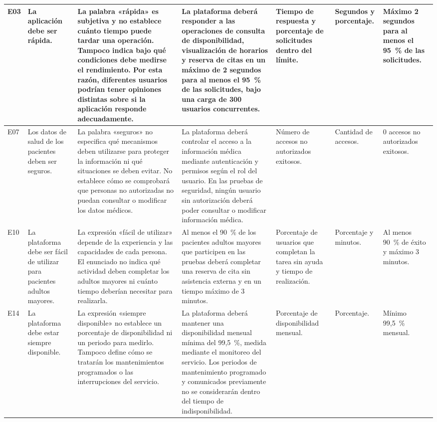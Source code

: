 \begin{landscape}
\begin{longtable}{|L{0.05\tw}|L{0.135\tw}|L{0.195\tw}|L{0.26\tw}|L{0.13\tw}|L{0.09\tw}|L{0.14\tw}|}
E03 & La aplicación debe ser rápida. & La palabra «rápida» es subjetiva y no establece cuánto tiempo puede tardar una operación. Tampoco indica bajo qué condiciones debe medirse el rendimiento. Por esta razón, diferentes usuarios podrían tener opiniones distintas sobre si la aplicación responde adecuadamente. & La plataforma deberá responder a las operaciones de consulta de disponibilidad, visualización de horarios y reserva de citas en un máximo de 2 segundos para al menos el 95~\% de las solicitudes, bajo una carga de 300 usuarios concurrentes. & Tiempo de respuesta y porcentaje de solicitudes dentro del límite. & Segundos y porcentaje. & Máximo 2 segundos para al menos el 95~\% de las solicitudes. \\ \hline
E07 & Los datos de salud de los pacientes deben ser seguros. & La palabra «seguros» no especifica qué mecanismos deben utilizarse para proteger la información ni qué situaciones se deben evitar. No establece cómo se comprobará que personas no autorizadas no puedan consultar o modificar los datos médicos. & La plataforma deberá controlar el acceso a la información médica mediante autenticación y permisos según el rol del usuario. En las pruebas de seguridad, ningún usuario sin autorización deberá poder consultar o modificar información médica. & Número de accesos no autorizados exitosos. & Cantidad de accesos. & 0 accesos no autorizados exitosos. \\ \hline
E10 & La plataforma debe ser fácil de utilizar para pacientes adultos mayores. & La expresión «fácil de utilizar» depende de la experiencia y las capacidades de cada persona. El enunciado no indica qué actividad deben completar los adultos mayores ni cuánto tiempo deberían necesitar para realizarla. & Al menos el 90~\% de los pacientes adultos mayores que participen en las pruebas deberá completar una reserva de cita sin asistencia externa y en un tiempo máximo de 3 minutos. & Porcentaje de usuarios que completan la tarea sin ayuda y tiempo de realización. & Porcentaje y minutos. & Al menos 90~\% de éxito y máximo 3 minutos. \\ \hline
E14 & La plataforma debe estar siempre disponible. & La expresión «siempre disponible» no establece un porcentaje de disponibilidad ni un periodo para medirlo. Tampoco define cómo se tratarán los mantenimientos programados o las interrupciones del servicio. & La plataforma deberá mantener una disponibilidad mensual mínima del 99,5~\%, medida mediante el monitoreo del servicio. Los periodos de mantenimiento programado y comunicados previamente no se considerarán dentro del tiempo de indisponibilidad. & Porcentaje de disponibilidad mensual. & Porcentaje. & Mínimo 99,5~\% mensual. \\ \hline

\end{longtable}
\end{landscape}
